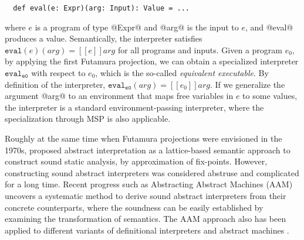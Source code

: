 \begin{lstlisting}
  def eval(e: Expr)(arg: Input): Value = ...
\end{lstlisting}

where $e$ is a program of type @Expr@ and @arg@ is the input to $e$,
and @eval@ produces a value.
Semantically, the interpreter satisfies $ \texttt{eval}(e)(arg) = [\![ e ]\!] arg$ for all
programs and inputs. Given a program $e_0$, by applying the first Futamura
projection, we can obtain a specialized interpreter
$\texttt{eval}_{\texttt{e0}}$ with respect to $e_0$, which is the so-called \textit{equivalent executable}. 
By definition of the interpreter, 
$\texttt{eval}_{\texttt{e0}}(arg) = [\![ e_0 ]\!] arg $. If we generalize the
argument @arg@ to an environment that maps free variables in $e$ to some
values, the interpreter is a standard environment-passing interpreter,
where the specialization through MSP is also applicable.

Roughly at the same time when Futamura projections were envisioned in the 1970s,
\citet{DBLP:conf/popl/CousotC77} proposed abstract interpretation as a
lattice-based semantic approach to construct sound static analysis, by
approximation of fix-points. However, constructing sound abstract interpreters
was considered abstruse and complicated for a long time.
Recent progress such as Abstracting Abstract Machines (AAM)
\cite{DBLP:conf/icfp/HornM10} uncovers a systematic method to derive sound
abstract interpreters from their concrete counterparts, where the soundness can
be easily established by examining the transformation of semantics. The AAM
approach also has been applied to different variants of definitional
interpreters and abstract machines \cite{DBLP:journals/jfp/HornM12,
DBLP:conf/icfp/HornM10, DBLP:journals/pacmpl/DaraisLNH17}.

